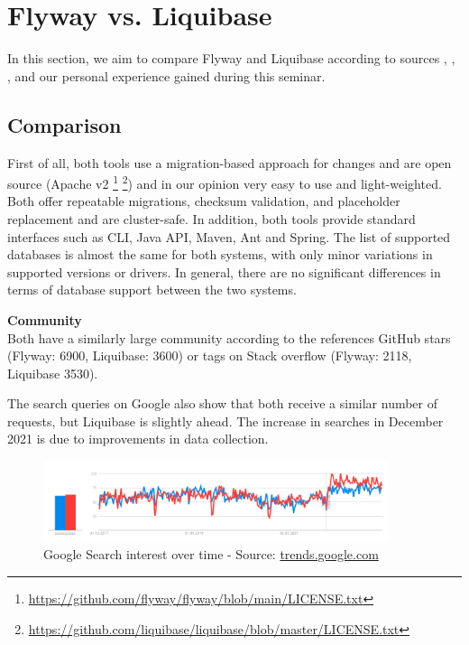 

\chapter{Flyway vs. Liquibase}

In this section, we aim to compare Flyway and Liquibase according to sources \cite{Parsick2018}, \cite{Kaps2016}, \cite{LiquibaseVSFlyway}, \cite{Zylinski2022} and our personal experience gained during this seminar.

\section{Comparison}
%
First of all, both tools use a migration-based approach for changes and are open source (Apache v2  \footnote{\url{https://github.com/flyway/flyway/blob/main/LICENSE.txt}} \footnote{\url{https://github.com/liquibase/liquibase/blob/master/LICENSE.txt}}) and in our opinion very easy to use and light-weighted.
Both offer repeatable migrations, checksum validation, and placeholder replacement and are cluster-safe.
In addition, both tools provide standard interfaces such as CLI, Java API, Maven, Ant and Spring.
The list of supported databases is almost the same for both systems, with only minor variations in supported versions or drivers. In general, there are no significant differences in terms of database support between the two systems.

%
\textbf{Community}\\
Both have a similarly large community according to the references GitHub stars (Flyway: 6900, Liquibase: 3600) or tags on Stack overflow (Flyway: 2118, Liquibase 3530).

The search queries on Google also show that both receive a similar number of requests, but Liquibase is slightly ahead. The increase in searches in December 2021 is due to improvements in data collection. 
\begin{figure}[H]
	\centering
	\includegraphics[width=0.9\textwidth]{./chapters/flyway_vs_liquibase/images/flyway_liquibase_search_history}
	\caption[Google Search interest over time - Source: Google Trends]{Google Search interest over time - Source: \url{trends.google.com}}
\end{figure}


